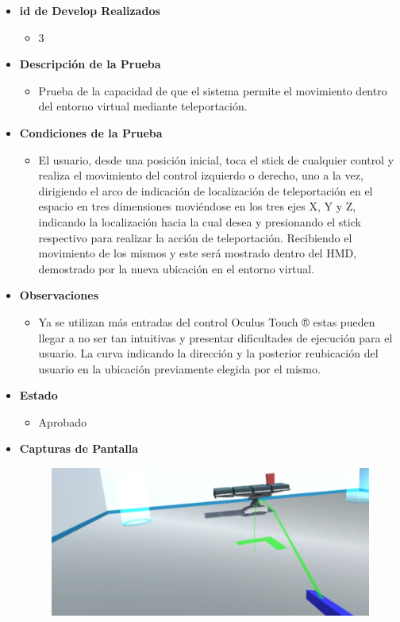 \begin{itemize}
    \item \textbf{id de Develop Realizados}
    \begin{itemize}
        \item 3
    \end{itemize}
    \item \textbf{Descripción de la Prueba}
    \begin{itemize}
        \item Prueba de la capacidad de que el sistema permite el movimiento dentro del entorno virtual mediante teleportación.
    \end{itemize}
    \item \textbf{Condiciones de la Prueba}
    \begin{itemize}
        \item 
        El usuario, desde una posición inicial, toca el stick de cualquier control y realiza el movimiento del control izquierdo o derecho, uno a la vez, dirigiendo el arco de indicación de localización de teleportación en el espacio en tres dimensiones moviéndose en los tres ejes X, Y y Z, indicando la localización hacia la cual desea y presionando el stick respectivo para realizar la acción de teleportación. Recibiendo el movimiento de los mismos y este será mostrado dentro del HMD, demostrado por la nueva ubicación en el entorno virtual.\\        
    \end{itemize}
    \item \textbf{Observaciones}
    \begin{itemize}
        \item Ya se utilizan más entradas del control Oculus Touch ® estas pueden llegar a no ser tan intuitivas y presentar dificultades de ejecución para el usuario. La curva indicando la dirección y la posterior reubicación del usuario en la ubicación previamente elegida por el mismo.
    \end{itemize}
    \item \textbf{Estado}
    \begin{itemize}
        \item Aprobado
    \end{itemize}
    \item \textbf{Capturas de Pantalla}
    \begin{figure}[H]
       	\begin{center}
       		\includegraphics[width = .7\textwidth]{source/images/image12.png}

\end{center}
\end{figure}
\end{itemize}
